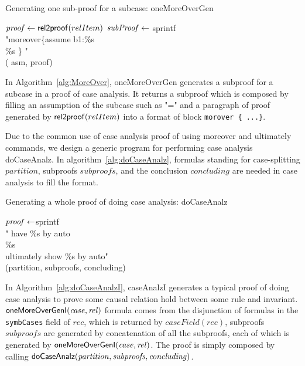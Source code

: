 \begin{algorithm}[!t]
\caption{Generating one sub-proof for a subcase: oneMoreOverGen}\label{alg:MoreOver}

{
${\it proof} \leftarrow {\sf rel2proof}(relItem)$\;
${\it subProof} \leftarrow$  sprintf\\
\twoSpaces "moreover\{assume  b1:\%s  \\
           \%s    \} "\\
\twoSpaces ( asm, proof)\;
}
\end{algorithm}

In Algorithm~\ref{alg:MoreOver}, {\sf oneMoreOverGen} generates a subproof
for a subcase in a proof of case analysis.
It returns a subproof which is composed by filling an assumption of the subcase such as
"=" and a paragraph of proof generated by ${\sf rel2proof}(relItem)$
into a format of block {\tt morover \{ ...\}}.

Due to the common use of case analysis proof of using {\sf moreover} and {\sf ultimately} commands,
we design a generic program for performing case analysis {\sf doCaseAnalz}.
In algorithm~\ref{alg:doCaseAnalz}, formulas standing for case-splitting $partition$,
subproofs $subproofs$, and the conclusion $concluding$ are needed  in case analysis to fill the format.

\begin{algorithm}[!t]

\caption{Generating a whole proof of doing case analysis: doCaseAnalz}\label{alg:doCaseAnalz}
{
${\it proof} \leftarrow $sprintf\\
\twoSpaces \twoSpaces  " have \%s  by auto\\
\twoSpaces \twoSpaces         \%s\\
\twoSpaces \twoSpaces        ultimately show \%s by auto"\\
\twoSpaces     (partition, subproofs,  concluding) \;
}
\end{algorithm}


In Algorithm~\ref{alg:doCaseAnalzI},
{\sf caseAnalzI} generates a typical proof of doing case analysis to
prove some causal relation hold between some rule and invariant.
${\sf oneMoreOverGenI}({\it case},{\it rel})$ formula comes from the disjunction of formulas
in the {\tt symbCases} field of $rec$,
which is returned by $caseField(rec)$,
subproofs $subproofs$ are generated by concatenation of all the subproofs,
each of which is generated by ${\sf oneMoreOverGenI}({\it case},{\it rel})$.
The proof is simply composed by calling ${\sf doCaseAnalz}({\it partition},{\it subproofs},{\it concluding})$.

